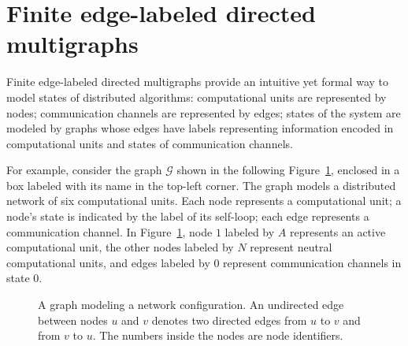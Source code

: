 \section{Finite edge-labeled directed multigraphs} 
Finite edge-labeled directed multigraphs provide an intuitive yet formal way to model states of distributed algorithms: computational units are represented by nodes; communication channels are represented by edges; states of the system are modeled by graphs whose edges have labels representing information encoded in computational units and states of communication channels. 

For example, consider the graph $\mathcal{G}$ shown in the following Figure~\ref{fig:graph_modeling_state_network}, enclosed in a box labeled with its name in the top-left corner. 
The graph models a distributed network of six computational units.
Each node represents a computational unit; a node's state is indicated by the label of its self-loop; each edge represents a communication channel. In Figure~\ref{fig:graph_modeling_state_network}, node $1$ labeled by $A$ represents an active computational unit, the other nodes labeled by $N$ represent neutral computational units, and edges labeled by $0$ represent communication channels in state $0$. 
\begin{figure}[H]
        \centering
    \caption{A graph modeling a network configuration. An undirected edge between nodes $u$ and $v$ denotes two directed edges from $u$ to $v$ and from $v$ to $u$. The numbers inside the nodes are node identifiers.}
    \label{fig:graph_modeling_state_network}
\end{figure}

